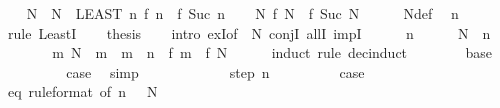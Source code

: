 \begin{isabellebody}
\isanewline
\ \ \isamarkupfalse%
\ N\ \ {\isachardoublequoteopen}N\ {\isacharequal}{\kern0pt}\ {\isacharparenleft}{\kern0pt}LEAST\ n{\isachardot}{\kern0pt}\ f\ n\ {\isacharequal}{\kern0pt}\ f\ {\isacharparenleft}{\kern0pt}Suc\ n{\isacharparenright}{\kern0pt}{\isacharparenright}{\kern0pt}{\isachardoublequoteclose}\isanewline
\ \ \isamarkupfalse%
\ N{\isacharcolon}{\kern0pt}\ {\isachardoublequoteopen}f\ N\ {\isacharequal}{\kern0pt}\ f\ {\isacharparenleft}{\kern0pt}Suc\ N{\isacharparenright}{\kern0pt}{\isachardoublequoteclose}\isanewline
\ \ \ \ \isamarkupfalse%
\ N{\isacharunderscore}{\kern0pt}def\ \isamarkupfalse%
\ n\ \isamarkupfalse%
\ {\isacharparenleft}{\kern0pt}rule\ LeastI{\isacharparenright}{\kern0pt}\isanewline
\ \ \isamarkupfalse%
\ {\isacharquery}{\kern0pt}thesis\isanewline
\ \ \isamarkupfalse%
\ {\isacharparenleft}{\kern0pt}intro\ exI{\isacharbrackleft}{\kern0pt}of\ {\isacharunderscore}{\kern0pt}\ N{\isacharbrackright}{\kern0pt}\ conjI\ allI\ impI{\isacharparenright}{\kern0pt}\isanewline
\ \ \ \ \isamarkupfalse%
\ n\isanewline
\ \ \ \ \isamarkupfalse%
\ {\isachardoublequoteopen}N\ {\isasymle}\ n{\isachardoublequoteclose}\isanewline
\ \ \ \ \isamarkupfalse%
\ \isamarkupfalse%
\ {\isachardoublequoteopen}{\isasymAnd}m{\isachardot}{\kern0pt}\ N\ {\isasymle}\ m\ {\isasymLongrightarrow}\ m\ {\isasymle}\ n\ {\isasymLongrightarrow}\ f\ m\ {\isacharequal}{\kern0pt}\ f\ N{\isachardoublequoteclose}\isanewline
\ \ \ \ \isamarkupfalse%
\ {\isacharparenleft}{\kern0pt}induct\ rule{\isacharcolon}{\kern0pt}\ dec{\isacharunderscore}{\kern0pt}induct{\isacharparenright}{\kern0pt}\isanewline
\ \ \ \ \ \ \isamarkupfalse%
\ base\isanewline
\ \ \ \ \ \ \isamarkupfalse%
\ \isamarkupfalse%
\ {\isacharquery}{\kern0pt}case\ \isamarkupfalse%
\ simp\isanewline
\ \ \ \ \isamarkupfalse%
\isanewline
\ \ \ \ \ \ \isamarkupfalse%
\ {\isacharparenleft}{\kern0pt}step\ n{\isacharparenright}{\kern0pt}\isanewline
\ \ \ \ \ \ \isamarkupfalse%
\ \isamarkupfalse%
\ {\isacharquery}{\kern0pt}case\isanewline
\ \ \ \ \ \ \ \ \isamarkupfalse%
\ eq\ {\isacharbrackleft}{\kern0pt}rule{\isacharunderscore}{\kern0pt}format{\isacharcomma}{\kern0pt}\ of\ {\isachardoublequoteopen}n\ {\isacharminus}{\kern0pt}\ {}{\isachardoublequoteclose}{\isacharbrackright}{\kern0pt}\ N\isanewline

\end{isabellebody}
